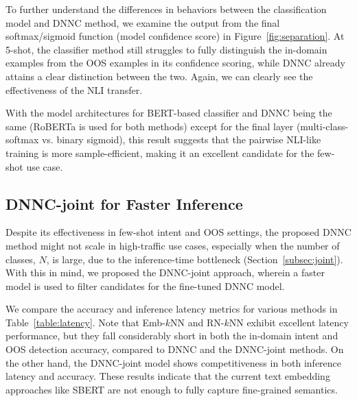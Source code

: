 To further understand the differences in behaviors between the classification model and DNNC method, we examine the output from the final softmax/sigmoid function (model confidence score) in Figure~\ref{fig:separation}.
At 5-shot, the classifier method still struggles to fully distinguish the in-domain examples from the OOS examples in its confidence scoring, while DNNC already attains a clear distinction between the two.
Again, we can clearly see the effectiveness of the NLI transfer.

With the model architectures for BERT-based classifier and DNNC being the same (RoBERTa is used for both methods) except for the final layer (multi-class-softmax vs. binary sigmoid), this result suggests that the pairwise NLI-like training is more sample-efficient, making it an excellent candidate for the few-shot use case.


\subsection{DNNC-joint for Faster Inference}
Despite its effectiveness in few-shot intent and OOS settings, the proposed DNNC method might not scale in high-traffic use cases, especially when the number of classes, $N$, is large, due to the inference-time bottleneck (Section~\ref{subsec:joint}).
With this in mind, we proposed the DNNC-joint approach, wherein a faster model is used to filter candidates for the fine-tuned DNNC model. 

We compare the accuracy and inference latency metrics for various methods in Table~\ref{table:latency}.
Note that Emb-$k$NN and RN-$k$NN exhibit excellent latency performance, but they fall considerably short in both the in-domain intent and OOS detection accuracy, compared to DNNC and the DNNC-joint methods.
On the other hand, the DNNC-joint model shows competitiveness in both inference latency and accuracy.
These results indicate that the current text embedding approaches like SBERT are not enough to fully capture fine-grained semantics.

